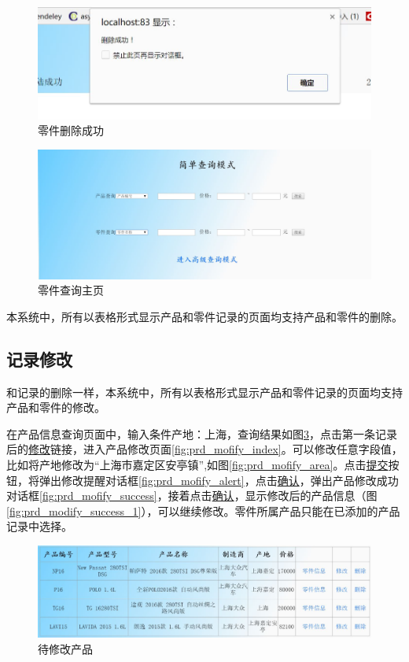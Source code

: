 \begin{figure}[H]
\centering
\includegraphics[width=0.8\linewidth]{figure/part_delete_alert_success}
\caption{零件删除成功}
\label{fig:part_delete_alert_success}
\end{figure}

\begin{figure}[H]
\centering
\includegraphics[width=0.8\linewidth]{figure/part_delete_search_index}
\caption{零件查询主页}
\label{fig:part_delete_search_index}
\end{figure}

本系统中，所有以表格形式显示产品和零件记录的页面均支持产品和零件的删除。
\subsection{记录修改}
和记录的删除一样，本系统中，所有以表格形式显示产品和零件记录的页面均支持产品和零件的修改。

在产品信息查询页面中，输入条件产地：上海，查询结果如图\ref{fig:prd_modify_recd}，点击第一条记录后的\underline{修改}链接，进入产品修改页面\ref{fig:prd_mofify_index}。可以修改任意字段值，比如将产地修改为``上海市嘉定区安亭镇'',如图\ref{fig:prd_mofify_area}。点击\underline{提交}按钮，将弹出修改提醒对话框\ref{fig:prd_mofify_alert}，点击\underline{确认}，弹出产品修改成功对话框\ref{fig:prd_mofify_success}，接着点击\underline{确认}，显示修改后的产品信息（图\ref{fig:prd_modify_success_1}），可以继续修改。零件所属产品只能在已添加的产品记录中选择。
\begin{figure}[H]
\centering
\includegraphics[width=0.8\linewidth]{figure/prd_modify_recd}
\caption{待修改产品}
\label{fig:prd_modify_recd}
\end{figure}

